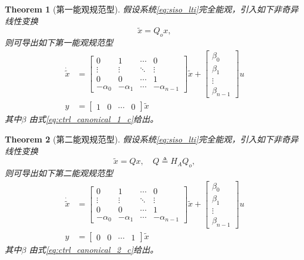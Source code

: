\documentclass[14pt,a4paper]{article}
\theoremstyle{plain}
\newtheorem{thm}{Theorem}[section]
\theoremstyle{definition}
\theoremstyle{remark}
\theoremstyle{plain}
\theoremstyle{plain}
\theoremstyle{plain}
\theoremstyle{definition}
\theoremstyle{remark}
\numberwithin{equation}{section}
\begin{document}
				\begin{thm}[第一能观规范型]  
				\label{the:第一能观规范型}
				假设系统\eqref{eq:siso_lti}完全能观，引入如下非奇异线性变换
				\[
					\tilde x = Q_o x
				,\] 
				则可导出如下第一能观规范型
				\begin{equation}
				\label{eq:obsv_canonical_1}
					\begin{split}
						\dot{\tilde x} &= \begin{bmatrix}
							0 & 1& \cdots & 0\\ 
							\vdots &\vdots&\ddots&\vdots \\ 
							0 & 0& \cdots &1 \\ 
							-\alpha_0 & -\alpha_1 & \cdots  & -\alpha_{n-1}
					\end{bmatrix} \tilde x + \begin{bmatrix}
						\beta_0\\
						\beta_1\\
						\vdots\\
						\beta_{n-1}
					\end{bmatrix} u \\ 
					y &= \begin{bmatrix}
						1 & 0 & \cdots & 0 
					\end{bmatrix} \tilde x
					\end{split}
				\end{equation}
				其中$\beta $ 由式\eqref{eq:ctrl_canonical_1_c}给出。
				\end{thm} 

				\begin{thm}[第二能观规范型]  
				\label{the:第二能观规范型}
				假设系统\eqref{eq:siso_lti}完全能观，引入如下非奇异线性变换
				\[
					\tilde x = Q x, \quad Q \triangleq H_A Q_o
				,\] 
				则可导出如下第二能观规范型
				\begin{equation}
				\label{eq:obsv_canonical_2}
					\begin{split}
						\dot{\tilde x} &= \begin{bmatrix}
							0 & 1& \cdots & 0\\ 
							\vdots &\vdots&\ddots&\vdots \\ 
							0 & 0& \cdots &1 \\ 
							-\alpha_0 & -\alpha_1 & \cdots  & -\alpha_{n-1}
					\end{bmatrix} \tilde x + \begin{bmatrix}
						\beta_0\\
						\beta_1\\
						\vdots\\
						\beta_{n-1}	
					\end{bmatrix} u \\ 
					y &= \begin{bmatrix}
						0& 0 & \cdots & 1 
					\end{bmatrix} \tilde x
					\end{split}
				\end{equation}
				其中$\beta $ 由式\eqref{eq:ctrl_canonical_2_c}给出。
				\end{thm} 
			
\end{document}
